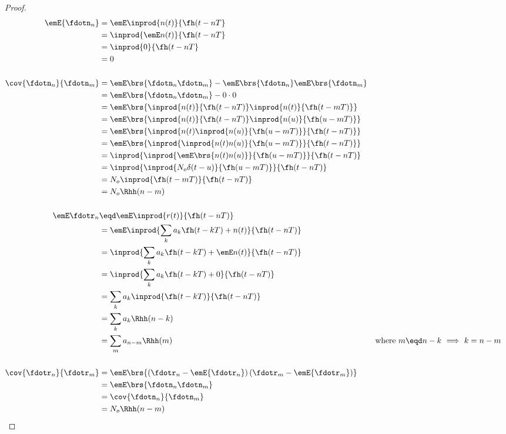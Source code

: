\begin{proof}
\begin{align*}
   \emE{\fdotn_n}
     &=    \emE \inprod{n(t)}{\fh(t-nT}
   \\&=    \inprod{\emE n(t)}{\fh(t-nT}
   \\&=    \inprod{0}{\fh(t-nT}
   \\&=    0
   \\
   \\
   \cov{\fdotn_n}{\fdotn_m}
     &= \emE\brs{\fdotn_n \fdotn_m} - \emE\brs{\fdotn_n}\emE\brs{\fdotn_m}
   \\&= \emE\brs{\fdotn_n \fdotn_m} - 0\cdot0
   \\&= \emE\brs{\inprod{n(t)}{\fh(t-nT)} \inprod{n(t)}{\fh(t-mT)}}
   \\&= \emE\brs{\inprod{n(t)}{\fh(t-nT)} \inprod{n(u)}{\fh(u-mT)}}
   \\&= \emE\brs{\inprod{n(t)\inprod{n(u)}{\fh(u-mT)}}{\fh(t-nT)} }
   \\&= \emE\brs{\inprod{\inprod{n(t)n(u)}{\fh(u-mT)}}{\fh(t-nT)} }
   \\&= \inprod{\inprod{\emE\brs{n(t)n(u)}}{\fh(u-mT)}}{\fh(t-nT)}
   \\&= \inprod{\inprod{N_o\delta(t-u)}{\fh(u-mT)}}{\fh(t-nT)}
   \\&= N_o \inprod{\fh(t-mT)}{\fh(t-nT)}
   \\&= N_o \Rhh(n-m)
   \\
   \\
   \emE\fdotr_n
     &\eqd \emE\inprod{r(t)}{\fh(t-nT)}
   \\&=    \emE\inprod{\sum_k a_k \fh(t-kT) + n(t)}{\fh(t-nT)}
   \\&=    \inprod{\sum_k a_k \fh(t-kT) + \emE n(t)}{\fh(t-nT)}
   \\&=    \inprod{\sum_k a_k \fh(t-kT) + 0}{\fh(t-nT)}
   \\&=    \sum_k a_k \inprod{\fh(t-kT)}{\fh(t-nT)}
   \\&=    \sum_k a_k \Rhh(n-k)
   \\&=    \sum_m a_{n-m} \Rhh(m)  
     && \text{where $m\eqd n-k$ $\implies$ $k=n-m$}
   \\
   \\
   \cov{\fdotr_n}{\fdotr_m}
     &= \emE\brs{\left(\fdotr_n-\emE{\fdotr_n}\right)\left(\fdotr_m-\emE{\fdotr_m}\right)}
   \\&= \emE\brs{\fdotn_n \fdotn_m }
   \\&= \cov{\fdotn_n}{\fdotn_m}
   \\&= N_o \Rhh(n-m)
\end{align*}
\end{proof}


